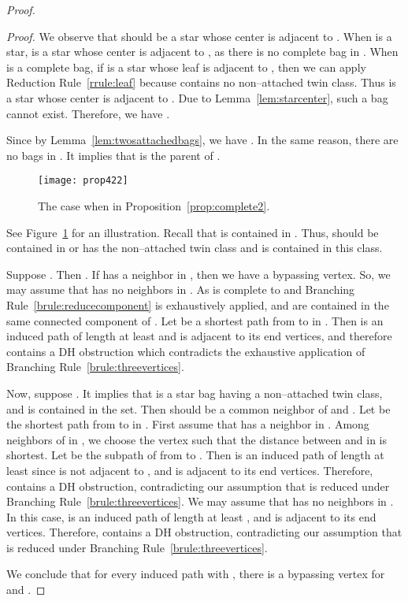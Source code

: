 \documentclass[11pt]{elsarticle}
\newenvironment{clproof}{\begin{list}{}{\setlength{\leftmargin}{5mm}} \item {\it Proof.} }{\hfill\end{list}\medskip}
\begin{document}
\begin{proof}
\begin{clproof}
We observe that  should be a star whose center is adjacent to .
When  is a star,  is a star whose center is adjacent to , as there is no complete bag in .
When  is a complete bag, if  is a star whose leaf is adjacent to , 
then we can apply Reduction Rule~\ref{rrule:leaf} because  contains no non--attached twin class.
Thus  is a star whose center is adjacent to .
Due to Lemma~\ref{lem:starcenter}, such a bag  cannot exist. 
Therefore, we have . 

Since  by Lemma~\ref{lem:twosattachedbags}, we have . 
In the same reason, there are no bags in . It implies that  is the parent of .
\end{clproof}






  \begin{figure}[t]
    \centering
      \texttt{[image: prop422]}


    \caption{The case when  in Proposition~\ref{prop:complete2}.} \label{fig:prop422}
      
  \end{figure}

See Figure~\ref{fig:prop422} for an illustration.
Recall that  is contained in . Thus,  should be contained in  or
 has the non--attached twin class and  is contained in this class.

Suppose . Then . 
If  has a neighbor in , then we have a bypassing vertex.
So, we may assume that  has no neighbors in .
As  is complete to  and Branching Rule~\ref{brule:reducecomponent} is exhaustively applied,
 and  are contained in the same connected component of .
Let  be a shortest path from  to  in .
Then  is an induced path of length at least  and  is adjacent to its end vertices, and therefore  contains a DH obstruction 
which contradicts the exhaustive application of Branching Rule~\ref{brule:threevertices}. 

Now, suppose . It implies that  is a star bag having a non--attached twin class, and  is contained in the set.
Then  should be a common neighbor of  and .  
Let  be the shortest path from  to  in .
First assume that  has a neighbor in . Among neighbors of  in , we choose the vertex  such that the distance between  and  in  is shortest.
Let  be the subpath of  from  to .
Then  is an induced path of length at least  since  is not adjacent to , 
and  is adjacent to its end vertices. 
Therefore,  contains a DH obstruction, contradicting our assumption that 
 is reduced under Branching Rule~\ref{brule:threevertices}.
We may assume that  has no neighbors in .
In this case, 
 is an induced path of length at least , and  is adjacent to its end vertices.
Therefore,  contains a DH obstruction, contradicting our assumption that 
 is reduced under Branching Rule~\ref{brule:threevertices}.

\medskip
We conclude that for every induced path  with , 
  there is a bypassing vertex for  and .
\end{proof}
\end{document}
